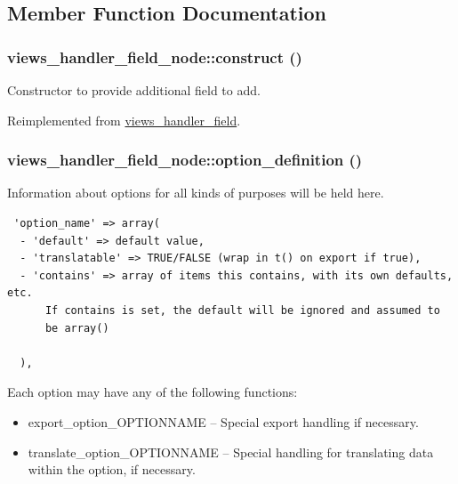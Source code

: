 \subsection{Member Function Documentation}
\hypertarget{classviews__handler__field__node_70404545ab178e131881fa5c5edd4b87}{
\subsubsection[{construct}]{\setlength{\rightskip}{0pt plus 5cm}views\_\-handler\_\-field\_\-node::construct ()}}
\label{classviews__handler__field__node_70404545ab178e131881fa5c5edd4b87}


Constructor to provide additional field to add. 

Reimplemented from \hyperlink{classviews__handler__field_3d50050864c255b71c842972a45d39f6}{views\_\-handler\_\-field}.\hypertarget{classviews__handler__field__node_c2daf04495ea792ad0dd60c864f3a77e}{
\subsubsection[{option\_\-definition}]{\setlength{\rightskip}{0pt plus 5cm}views\_\-handler\_\-field\_\-node::option\_\-definition ()}}
\label{classviews__handler__field__node_c2daf04495ea792ad0dd60c864f3a77e}


Information about options for all kinds of purposes will be held here. 

\begin{Code}\begin{verbatim} 'option_name' => array(
  - 'default' => default value,
  - 'translatable' => TRUE/FALSE (wrap in t() on export if true),
  - 'contains' => array of items this contains, with its own defaults, etc.
      If contains is set, the default will be ignored and assumed to
      be array()

  ),
\end{verbatim}
\end{Code}

 Each option may have any of the following functions:\begin{itemize}
\item export\_\-option\_\-OPTIONNAME -- Special export handling if necessary.\item translate\_\-option\_\-OPTIONNAME -- Special handling for translating data within the option, if necessary. \end{itemize}


